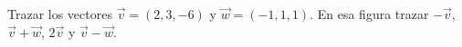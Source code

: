 Trazar los vectores $\vec{v} = (2,3,-6)$ y $\vec{w} = (-1,1,1)$. En esa figura trazar $-\vec{v}$, $\vec{v} + \vec{w}$, $2\vec{v}$ y $\vec{v} - \vec{w}$.
